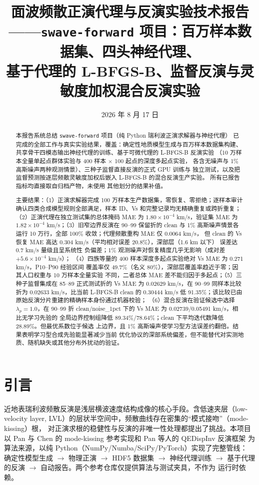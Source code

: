 \documentclass[UTF8,a4paper,11pt]{ctexart}
\title{\textbf{面波频散正演代理与反演实验技术报告}\\
\large ——\texttt{swave-forward} 项目：百万样本数据集、四头神经代理、\\
基于代理的 L-BFGS-B、监督反演与灵敏度加权混合反演实验}
\author{}
\date{2026 年 8 月 17 日}
\begin{document}
\maketitle

\begin{abstract}
\noindent 本报告系统总结 \texttt{swave-forward} 项目（纯 Python 瑞利波正演求解器与神经代理）
已完成的全部工作与真实实验结果，覆盖：确定性地质模型生成与百万样本数据集构建、
共享骨干四模态输出神经代理的训练、基于可微代理的 L-BFGS-B 反演实验
（10 万样本全量单起点群体实验与 400 样本 \(\times\) 100 起点的深度多起点实验，
各含无噪声与 1\% 高斯噪声两种观测情景）、三种子监督直接反演的正式 GPU 训练与
独立测试，以及把监督预测按逐层频散灵敏度加权后嵌入 L-BFGS-B 的混合反演生产实验。
所有已报告指标均直接取自归档产物，未使用
其他划分的结果补值。

主要结果：（1）正演求解器完成 100 万样本生产数据集，零恢复、零拒绝；逐样本审计
确认四类合成模型规则全部满足，样本 ID、Vs 和完整记录均无精确重复或跨折重复；
（2）正演代理在独立测试集的总体掩码 MAE 为 \(1.80\times10^{-4}\) km/s，验证集
MAE 为 \(1.82\times10^{-4}\) km/s；（3）旧窄边界反演在 90--99 保留折的 clean 与
1\% 高斯噪声情景各运行 10 万行，全部 100\% 收敛；代理频散重构 MAE 仅 0.0064 km/s，
但 clean 的 Vs 恢复 MAE 高达 0.304 km/s（平均相对误差 20.8\%），深部层（1.6 km 以下）
误差达 0.7 km/s 量级且呈系统性
负偏差；1\% 观测噪声对恢复精度几乎无影响（成对差 \(+5.6\times10^{-4}\) km/s）；
（4）四族等量的 400 样本深度多起点实验绝对 Vs MAE 为 0.271 km/s，P10--P90 经验区间
覆盖率仅 49.7\%（名义 80\%），深部层覆盖率趋近于零；因其人口权重与 10 万样本全量实验
不同，二者总体 MAE 差不能归因于多起点；（5）三种子监督集成在 85--89 正式测试折的
Vs MAE 为 0.02629 km/s，在 90--99 同样本比较折为 0.02633 km/s，比当前 L-BFGS-B clean
的 0.30444 km/s 低 91.35\%；该比较已由原始反演分片重建的精确样本身份通过机器校验；
（6）混合反演在验证候选中选择 \(\lambda_p=1.0\)，在
90--99 折 clean/noise\_1pct 下的 Vs MAE 为 0.02739/0.05491 km/s，相比无学习先验的
全局边界控制组降低 89.34\%/78.64\%；clean 下平均迭代数降低 28.89\%。但最优系数位于候选
上边界，且 1\% 高斯噪声使学习型方法误差约翻倍。结果表明学习型合成先验能显著减少当前
优化协议的深部系统偏差，但不能替代对实测地质、随机缺失或其他分布外扰动的验证。
\end{abstract}

\tableofcontents
\newpage

\section{引言}
近地表瑞利波频散反演是浅层横波速度结构成像的核心手段。含低速夹层（low-velocity
layer, LVL）的层状半空间中，频散曲线存在密集的``模式接吻''（mode-kissing）根，
对正演求根的稳健性与反演的非唯一性处理都提出了挑战。本项目以 Pan 与 Chen 的
mode-kissing 参考实现\cite{pan-mode-kissing}和 Pan 等人的 QEDispInv 反演框架
\cite{pan-qedispinv}
为算法来源，以纯 Python（NumPy/Numba/SciPy/PyTorch）实现了完整管线：
确定性模型生成 \(\to\) 物理正演 \(\to\) HDF5 数据集 \(\to\) 神经代理训练
\(\to\) 基于代理的反演 \(\to\) 自动报告。两个参考仓库仅提供算法与测试夹具，不作为
运行时依赖。
\end{document}
